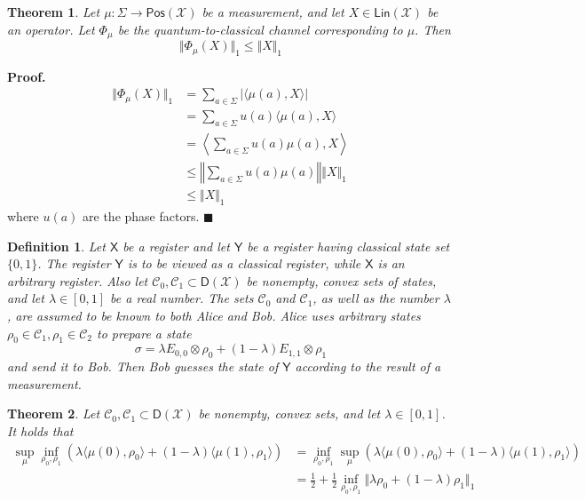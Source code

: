 \documentclass[aps,pra,onecolumn,notitlepage,superscriptaddress]{revtex4-1}
\newcommand{\reg}[1]{\mathsf{#1}}
\newcommand{\spc}[1]{\mathcal{#1}}
\newcommand{\Lin}{\mathsf{Lin}}
\newcommand{\Pos}{\mathsf{Pos}}
\newcommand{\D}{\mathsf{D}}
\def\>{\rangle}
\def\<{\langle}
\newtheorem{theo}{Theorem}
\newtheorem{defi}{Definition}
\def\Proof{{\bf Proof.~}}
\def\qed{$\blacksquare$ \newline}
\begin{document}
    \begin{theo}
        Let $\mu : \Sigma \to \Pos(\spc{X})$ be a measurement, and let $X \in \Lin(\spc{X})$ be an operator. Let $\Phi_\mu$ be the quantum-to-classical channel corresponding to $\mu$. Then
        \begin{equation}
            \Vert \Phi_\mu(X) \Vert_1 \leq \Vert X \Vert_1
        \end{equation}
    \end{theo}
    \Proof {
        \begin{align*}
            \Vert \Phi_\mu(X) \Vert_1
            &= \sum_{a \in \Sigma} | \< \mu(a), X \> | \\
            &= \sum_{a \in \Sigma} u(a) \< \mu(a), X \> \\
            &= \left\langle \sum_{a \in \Sigma} u(a)\mu(a), X \right\rangle \\
            &\leq \left\Vert \sum_{a \in \Sigma} u(a)\mu(a) \right\Vert \Vert X \Vert_1 \\
            &\leq \Vert X \Vert_1
        \end{align*}
        where $u(a)$ are the phase factors.
    } \qed

    \begin{defi}
        Let $\reg{X}$ be a register and let $\reg{Y}$ be a register having classical state set $\{0,1\}$. The register $\reg{Y}$ is to be viewed as a classical register, while $\reg{X}$ is an arbitrary register. Also let $\spc{C}_0, \spc{C}_1 \subset \D(\spc{X})$ be nonempty, convex sets of states, and let $\lambda \in [0,1]$ be a real number. The sets $\spc{C}_0$ and $\spc{C}_1$, as well as the number $\lambda$, are assumed to be known to both Alice and Bob. Alice uses arbitrary states $\rho_0 \in \spc{C}_1, \rho_1 \in \spc{C}_2$ to prepare a state 
        \begin{equation}
            \sigma = \lambda E_{0,0} \otimes \rho_0 + (1-\lambda) E_{1,1} \otimes \rho_1
        \end{equation}
        and send it to Bob. Then Bob guesses the state of $\reg{Y}$ according to the result of a measurement.
    \end{defi}

    \begin{theo}
        Let $\spc{C}_0, \spc{C}_1 \subset \D(\spc{X})$ be nonempty, convex sets, and let $\lambda \in [0,1]$. It holds that
        \begin{align}
            \sup_{\mu}\inf_{\rho_0, \rho_1} ( \lambda \< \mu(0),\rho_0 \> + (1-\lambda) \< \mu(1), \rho_1 \> ) 
            &= \inf_{\rho_0, \rho_1}\sup_{\mu} ( \lambda \< \mu(0),\rho_0 \> + (1-\lambda) \< \mu(1), \rho_1 \> ) \\
            &= \frac{1}{2} + \frac{1}{2} \inf_{\rho_0, \rho_1} \Vert \lambda \rho_0 + (1-\lambda) \rho_1 \Vert_1
        \end{align}
    \end{theo}
\end{document}
